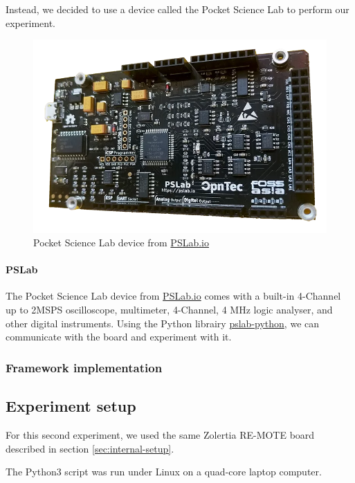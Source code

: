 Instead, we decided to use a device called the Pocket Science Lab to perform our experiment.


\begin{figure}[!ht]
  \centering
  \includegraphics[scale=0.25]{assets/pslab.png}
  \caption{\label{fig:pslab}Pocket Science Lab device from \href{https://pslab.io}{PSLab.io}}
\end{figure}

\paragraph{PSLab}
The Pocket Science Lab device from \href{https://pslab.io}{PSLab.io} comes with a built-in 4-Channel up to 2MSPS oscilloscope, multimeter, 4-Channel, 4 MHz logic analyser, and other digital instruments.
Using the Python librairy \href{https://github.com/fossasia/pslab-python}{pslab-python}, we can communicate with the board and experiment with it.

\subsubsection{Framework implementation}



\subsection{Experiment setup}
For this second experiment, we used the same Zolertia RE-MOTE board described in section \ref{sec:internal-setup}.

The Python3 script was run under Linux on a quad-core laptop computer.